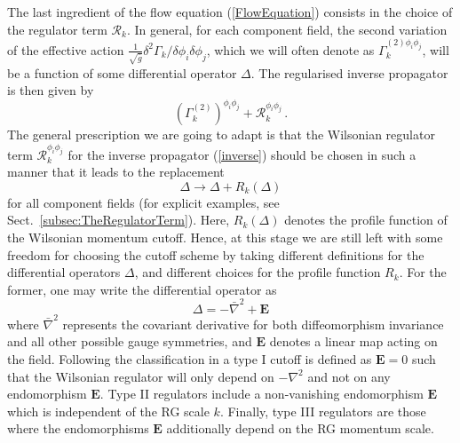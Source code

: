 \documentclass[notitlepage,eqsecnum,bm,amsmath,preprintnumbers,superscriptaddress,nofootinbib,aps,11pt]{revtex4-1}
\def\eq#1{(\ref{#1})}
\def\beq{\begin{equation}}
\def\eeq{\end{equation}}
\begin{document}
The last ingredient of the flow equation \eq{FlowEquation} consists in the choice of the regulator term $\mathcal{R}_k$. In general, for each component 
field, the second variation of the effective action
$ \frac{1}{\sqrt{\bar{g}} } {\delta^2\Gamma_k}/{\delta \phi_i\delta \phi_j}$,
which we will often denote as 
$\Gamma_k^{(2)\phi_i\phi_j}$,
 will be a function of some differential operator $\Delta$. The regularised inverse propagator is then given by
\begin{equation}
\label{inverse}
\left(\Gamma^{(2)}_k\right)^{\phi_i\phi_j}+\mathcal{R}_k^{\phi_i\phi_j}\,.
\end{equation} 
The general prescription we are going to adapt is that the Wilsonian regulator term
$\mathcal{R}_k^{\phi_i\phi_j}$ for the  inverse propagator   \eq{inverse}
should be chosen in such a manner that it leads to the replacement
\begin{equation}
\Delta\to\Delta+R_k(\Delta)
\end{equation} 
for all component fields (for explicit examples, see Sect.~\ref{subsec:TheRegulatorTerm}). Here, $R_k(\Delta)$ denotes the profile function of the Wilsonian momentum cutoff. Hence, at this stage we are still left with  some freedom for choosing the cutoff 
scheme by taking different definitions for the differential operators $\Delta$, and different choices for the  profile function $R_k$. For the former, one may write the differential operator 
as 
\beq
\Delta=- \bar \nabla^2+\mathbf{E}
\eeq
where $ \bar \nabla^2$ represents the covariant derivative for both diffeomorphism invariance and all other possible gauge symmetries, and 
$\mathbf{E}$ denotes a linear map acting on the field.
Following the classification in \cite{Codello:2008vh} a type I cutoff is defined as $\mathbf{E}=0$ such that the Wilsonian regulator will only depend on $-\nabla^2$ and 
not on any endomorphism $\mathbf{E}$. Type II regulators include a non-vanishing  endomorphism $\mathbf{E}$ which is independent of the RG scale $k$. Finally, type III regulators are those where the endomorphisms  $\mathbf{E}$ additionally depend on the RG momentum scale.






  
\end{document}
